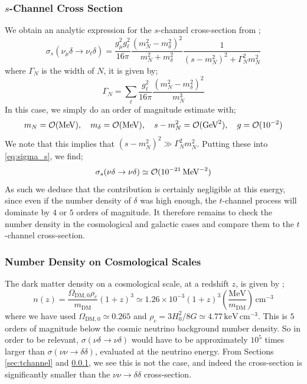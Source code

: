 \documentclass[10pt]{article}
\begin{document}
\subsubsection{$s$-Channel Cross Section}\label{sec:schannel}
We obtain an analytic expression for the $s$-channel cross-section from \cite{Franarin2018};
\begin{equation}
  \sigma_s(\nu_\mu\delta \rightarrow \nu_\ell \delta) = \frac{g_\mu^2 g_\ell^2}{16\pi}\frac{(m_N^2 - m_\delta^2)^2}{m_N^2 + m_\delta^2} \frac{1}{(s - m_N^2)^2 + \Gamma_N^2 m_N^2}
\end{equation}
where $\Gamma_N$ is the width of $N$, it is given by;
\begin{equation}\label{eq:sigma_s}
  \Gamma_N = \sum_{\ell}{\frac{g_\ell^2}{16\pi} \frac{(m_N^2 - m_\delta^2)^2}{m_N^3}}
\end{equation}
In this case, we simply do an order of magnitude estimate with;
\begin{equation}
  m_N = \mathcal{O}(\textrm{MeV}), \quad m_\delta = \mathcal{O}(\textrm{MeV}), \quad s - m_N^2 = \mathcal{O}(\textrm{GeV}^2), \quad g = \mathcal{O}(10^{-2})
\end{equation}
We note that this implies that $(s - m_N^2)^2 \gg \Gamma_N^2 m_N^2$. Putting these into \eqref{eq:sigma_s}, we find;
\begin{equation}
  \sigma_s(\nu\delta \rightarrow \nu\delta) \simeq \mathcal{O}(10^{-21}\,\textrm{MeV}^{-2})
\end{equation}
As such we deduce that the contribution is certainly negligible at this energy, since even if the number density of $\delta$ was high enough, the $t$-channel process will dominate by $4$ or $5$ orders of magnitude. It therefore remains to check the number density in the cosmological and galactic cases and compare them to the $t$-channel cross-section.
\subsubsection{Number Density on Cosmological Scales}
The dark matter density on a cosmological scale, at a redshift $z$, is given by \cite{Farzan2014};
\begin{equation}
  n(z) = \frac{\Omega_{\textrm{DM},0}\rho_c}{m_{\textrm{DM}}}(1 + z)^3 \simeq 1.26 \times 10^{-3} (1 + z)^3 \left(\frac{\textrm{MeV}}{m_{\textrm{DM}}}\right) \, \textrm{cm}^{-3}
\end{equation}
where we have used $\Omega_{\textrm{DM},0} \simeq 0.265$ and $\rho_c = 3H_0^2/8G \simeq 4.77\, \textrm{keV}\,\textrm{cm}^{-3}$. This is $5$ orders of magnitude below the cosmic neutrino background number density. So in order to be relevant, $\sigma(\nu\delta \rightarrow \nu\delta)$ would have to be approximately $10^5$ times larger than $\sigma(\nu\nu \rightarrow \delta\delta)$, evaluated at the neutrino energy. From Sections \ref{sec:tchannel} and \ref{sec:schannel}, we see this is not the case, and indeed the cross-section is significantly smaller than the $\nu\nu \rightarrow \delta\delta$ cross-section.
\end{document}
